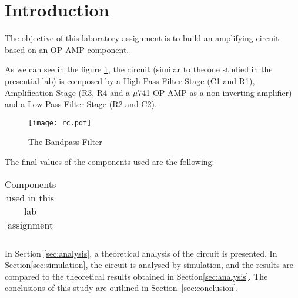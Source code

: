 \section{Introduction}
\label{sec:introduction}

The objective of this laboratory assignment is to build an amplifying circuit based on an OP-AMP component.

As we can see in the figure \ref{fig:rc}, the circuit (similar to the one studied in the presential lab) is composed by a High Pass Filter Stage (C1 and R1), Amplification Stage (R3, R4 and a $\mu$741 OP-AMP as a non-inverting amplifier) and a Low Pass Filter Stage (R2 and C2).

\begin{figure}[h] \centering
\texttt{[image: rc.pdf]}
\vspace{-5mm}
\caption{The Bandpass Filter}\label{fig:rc}
\end{figure}

The final values of the components used are the following:

\begin{table}[!htb]
\centering
  \begin{tabular}{|c|c|}
    \hline    
    
 \end{tabular}
 \caption{Components used in this lab assignment}\label{tab:components}
\end{table}


In Section \ref{sec:analysis}, a theoretical analysis of the circuit is presented. In Section\ref{sec:simulation}, the circuit is analysed by simulation, and the results are compared to the theoretical results obtained in Section\ref{sec:analysis}. The conclusions of this study are outlined in Section~\ref{sec:conclusion}.






